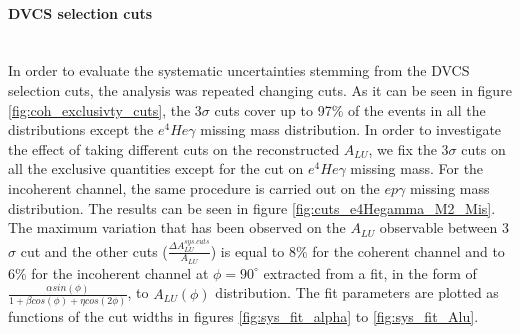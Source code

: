  

\paragraph{DVCS selection cuts}
~\\

In order to evaluate the systematic uncertainties stemming from the DVCS 
selection cuts, the analysis was repeated changing cuts. As it can be seen in 
figure \ref{fig:coh_exclusivty_cuts}, the 3$\sigma$ cuts cover up to 97$\%$ of 
the events in all the distributions except the $e^{4}He\gamma$ missing mass 
distribution. In order to investigate the effect of taking different cuts on 
the reconstructed $A_{LU}$, we fix the 3$\sigma$ cuts on all the exclusive 
quantities except for the cut on $e^{4}He\gamma$ missing mass. For the 
incoherent channel, the same procedure is carried out on the $ep\gamma$ missing 
mass distribution. The results can be seen in figure 
\ref{fig:cuts_e4Hegamma_M2_Mis}. The maximum variation that has been observed 
on the $A_{LU}$ observable between 3$\sigma$ cut and the other cuts 
($\frac{\Delta A^{sys. cuts}_{LU}}{A_{LU}}$) is equal to  8$\%$ for the 
coherent channel and to 6$\%$ for the incoherent channel at $\phi = 90^{\circ}$ 
extracted from a fit, in the form of $\frac{\alpha sin(\phi)}{1+\beta cos(\phi) 
+ \eta cos(2\phi)}$, to $A_{LU}(\phi)$ distribution. The fit parameters are 
plotted as functions of the cut widths in figures \ref{fig:sys_fit_alpha} to 
\ref{fig:sys_fit_Alu}.


